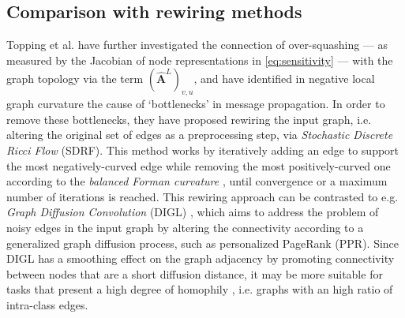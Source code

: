 \documentclass[final,5p,times,twocolumn]{elsarticle}
\begin{document}
\subsection{Comparison with rewiring methods}
\label{sec:experiments-rewiring}

Topping et al. \cite{Topping2022} have further investigated the connection of over-squashing --- as measured by the Jacobian of node representations in \eqref{eq:sensitivity} --- with the graph topology via the term $(\mathbf{\hat{A}}^{L})_{v,u}$, and have identified in negative local graph curvature the cause of `bottlenecks' in message propagation.
In order to remove these bottlenecks, they have proposed rewiring the input graph, i.e. altering the original set of edges as a preprocessing step, via \textsl{Stochastic Discrete Ricci Flow} (SDRF).
This method works by iteratively adding an edge to support the most negatively-curved edge while removing the most positively-curved one according to the \emph{balanced Forman curvature} \citep{Topping2022}, until convergence or a maximum number of iterations is reached.
This rewiring approach can be contrasted to e.g. \textsl{Graph Diffusion Convolution} (DIGL) \cite{Gasteiger2019}, which aims to address the problem of noisy edges in the input graph by altering the connectivity according to a generalized graph diffusion process, such as personalized PageRank (PPR).
Since DIGL has a smoothing effect on the graph adjacency by promoting connectivity between nodes that are a short diffusion distance, it may be more suitable for tasks that present a high degree of homophily \citep{Topping2022}, i.e. graphs with an high ratio of intra-class edges.
\end{document}
